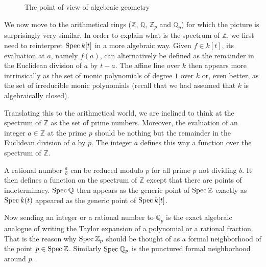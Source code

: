 \documentclass[11pt]{article}
\numberwithin{equation}{section}
\numberwithin{figure}{section}
\theoremstyle{definition}
\newcommand{\Z}{\mathbb Z}
\newcommand{\Zp}{\Z_p}
\newcommand{\Q}{\mathbb Q}
\newcommand{\Qp}{\Q_p}
\newcommand{\spec}{\text{\rm Spec}\:}
\begin{document}
\begin{figure}
\hfill \null

\caption{The point of view of algebraic geometry}
\label{fig:alggeom}
\end{figure}

\medskip

We now move to the arithmetical rings ($\Z$, $\Q$, $\Zp$ and $\Qp$) for 
which the picture is surprisingly very similar. In order to explain what 
is the spectrum of $\Z$, we first need to reinterpret $\spec k[t]$ in a 
more algebraic way. Given $f \in k[t]$, its evaluation at $a$, namely 
$f(a)$, can alternatively be defined as the remainder in the Euclidean 
division of $a$ by $t{-}a$. The affine line over $k$ then appears more 
intrinsically as the set of monic polynomials of degree $1$ over $k$ or, 
even better, as the set of irreducible monic polynomials (recall that we 
had assumed that $k$ is algebraically closed).

Translating this to the arithmetical world, we are inclined to think at 
the spectrum of $\Z$ as the set of prime numbers. Moreover, the 
evaluation of an integer $a \in \Z$ at the prime $p$ should be nothing 
but the remainder in the Euclidean division of $a$ by $p$. The integer 
$a$ defines this way a function over the spectrum of $\Z$.

A rational number $\frac a b$ can be reduced modulo $p$ for all prime 
$p$ not dividing $b$. It then defines a function on the spectrum of $\Z$ 
except that there are points of indeterminacy. $\spec \Q$ then appears as 
the generic point of $\spec \Z$ exactly as $\spec k(t)$ appeared as the
generic point of $\spec k[t]$.

Now sending an integer or a rational number to $\Qp$ is the exact
algebraic analogue of writing the Taylor expansion of a polynomial or
a rational fraction. That is the reason why $\spec \Zp$ should be
thought of as a formal neighborhood of the point $p \in \spec \Z$.
Similarly $\spec \Qp$ is the punctured formal neighborhood around $p$.
\end{document}
